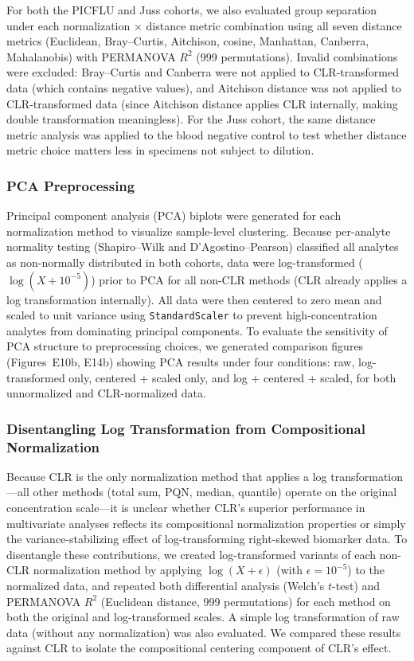 \documentclass[12pt]{article}
\begin{document}
For both the PICFLU and Juss cohorts, we also evaluated group separation under each normalization $\times$ distance metric combination using all seven distance metrics (Euclidean, Bray--Curtis, Aitchison, cosine, Manhattan, Canberra, Mahalanobis) with PERMANOVA $R^2$ (999 permutations). Invalid combinations were excluded: Bray--Curtis and Canberra were not applied to CLR-transformed data (which contains negative values), and Aitchison distance was not applied to CLR-transformed data (since Aitchison distance applies CLR internally, making double transformation meaningless). For the Juss cohort, the same distance metric analysis was applied to the blood negative control to test whether distance metric choice matters less in specimens not subject to dilution.

\subsubsection{PCA Preprocessing}

Principal component analysis (PCA) biplots were generated for each normalization method to visualize sample-level clustering. Because per-analyte normality testing (Shapiro--Wilk and D'Agostino--Pearson) classified all analytes as non-normally distributed in both cohorts, data were log-transformed ($\log(X + 10^{-5})$) prior to PCA for all non-CLR methods (CLR already applies a log transformation internally). All data were then centered to zero mean and scaled to unit variance using \texttt{StandardScaler} to prevent high-concentration analytes from dominating principal components. To evaluate the sensitivity of PCA structure to preprocessing choices, we generated comparison figures (Figures~E10b, E14b) showing PCA results under four conditions: raw, log-transformed only, centered + scaled only, and log + centered + scaled, for both unnormalized and CLR-normalized data.

\subsubsection{Disentangling Log Transformation from Compositional Normalization}

Because CLR is the only normalization method that applies a log transformation---all other methods (total sum, PQN, median, quantile) operate on the original concentration scale---it is unclear whether CLR's superior performance in multivariate analyses reflects its compositional normalization properties or simply the variance-stabilizing effect of log-transforming right-skewed biomarker data. To disentangle these contributions, we created log-transformed variants of each non-CLR normalization method by applying $\log(X + \epsilon)$ (with $\epsilon = 10^{-5}$) to the normalized data, and repeated both differential analysis (Welch's $t$-test) and PERMANOVA $R^2$ (Euclidean distance, 999 permutations) for each method on both the original and log-transformed scales. A simple log transformation of raw data (without any normalization) was also evaluated. We compared these results against CLR to isolate the compositional centering component of CLR's effect.
\end{document}
